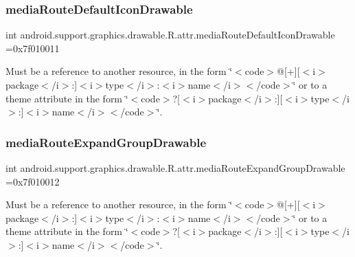 \subsubsection{\texorpdfstring{media\+Route\+Default\+Icon\+Drawable}{mediaRouteDefaultIconDrawable}}
{\footnotesize\ttfamily int android.\+support.\+graphics.\+drawable.\+R.\+attr.\+media\+Route\+Default\+Icon\+Drawable =0x7f010011\hspace{0.3cm}{\ttfamily [static]}}

Must be a reference to another resource, in the form \char`\"{}$<$code$>$@\mbox{[}+\mbox{]}\mbox{[}$<$i$>$package$<$/i$>$\+:\mbox{]}$<$i$>$type$<$/i$>$\+:$<$i$>$name$<$/i$>$$<$/code$>$\char`\"{} or to a theme attribute in the form \char`\"{}$<$code$>$?\mbox{[}$<$i$>$package$<$/i$>$\+:\mbox{]}\mbox{[}$<$i$>$type$<$/i$>$\+:\mbox{]}$<$i$>$name$<$/i$>$$<$/code$>$\char`\"{}. \mbox{\label{classandroid_1_1support_1_1graphics_1_1drawable_1_1R_1_1attr_a9bf44fc2b67a92b7380371f1a5d9be6e}} 
\subsubsection{\texorpdfstring{media\+Route\+Expand\+Group\+Drawable}{mediaRouteExpandGroupDrawable}}
{\footnotesize\ttfamily int android.\+support.\+graphics.\+drawable.\+R.\+attr.\+media\+Route\+Expand\+Group\+Drawable =0x7f010012\hspace{0.3cm}{\ttfamily [static]}}

Must be a reference to another resource, in the form \char`\"{}$<$code$>$@\mbox{[}+\mbox{]}\mbox{[}$<$i$>$package$<$/i$>$\+:\mbox{]}$<$i$>$type$<$/i$>$\+:$<$i$>$name$<$/i$>$$<$/code$>$\char`\"{} or to a theme attribute in the form \char`\"{}$<$code$>$?\mbox{[}$<$i$>$package$<$/i$>$\+:\mbox{]}\mbox{[}$<$i$>$type$<$/i$>$\+:\mbox{]}$<$i$>$name$<$/i$>$$<$/code$>$\char`\"{}. \mbox{\label{classandroid_1_1support_1_1graphics_1_1drawable_1_1R_1_1attr_a0ad945769e4c78fd1ed9fcc7f1a2e09c}} 
